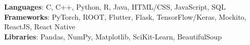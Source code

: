    \begin{itemize}[leftmargin=0.15in, label={}] 
    \small{\item{
      \textbf{Languages}: C, C++, Python, R, Java, HTML/CSS, JavaScript, SQL\\
      \textbf{Frameworks}: PyTorch, ROOT, Flutter, Flask, TensorFlow/Keras, Mockito, ReactJS, React Native\\
      \textbf{Libraries}: Pandas, NumPy, Matplotlib, SciKit-Learn, BeautifulSoup
       }}
\end{itemize}